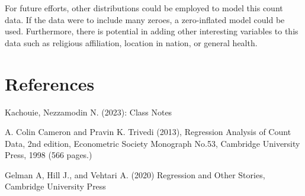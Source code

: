 \documentclass[11pt,regno]{amsart}
\theoremstyle{plain}
\numberwithin{equation}{section}
\begin{document}
For future efforts, other distributions could be employed to model this count data. If the data were to include many zeroes, a zero-inflated model could be used. Furthermore, there is potential in adding other interesting variables to this data such as religious affiliation, location in nation, or general health.





















\newpage

\section*{References}
\begingroup
\renewcommand{\section}[2]{}%
\begin{thebibliography}{9}


Kachouie, Nezzamodin N. (2023): 
Class Notes 



A. Colin Cameron and Pravin K. Trivedi (2013), Regression Analysis of Count Data, 2nd edition,
Econometric Society Monograph No.53, Cambridge University Press, 1998 (566 pages.)

Gelman A, Hill J., and Vehtari A. (2020)  Regression and Other Stories, Cambridge University Press

\end{thebibliography}
\endgroup

\

\

\
\end{document}
